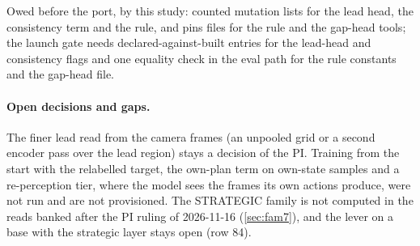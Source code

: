 \noindent Owed before the port, by this study: counted mutation lists for the lead head, the consistency term and the rule, and pins files for the rule and the gap-head tools; the launch gate needs declared-against-built entries for the lead-head and consistency flags and one equality check in the eval path for the rule constants and the gap-head file.

\paragraph{Open decisions and gaps.} The finer lead read from the camera frames (an unpooled grid or a second encoder pass over the lead region) stays a decision of the PI. Training from the start with the relabelled target, the own-plan term on own-state samples and a re-perception tier, where the model sees the frames its own actions produce, were not run and are not provisioned. The STRATEGIC family is not computed in the reads banked after the PI ruling of 2026-11-16 (\cref{sec:fam7}), and the lever on a base with the strategic layer stays open (row 84).

